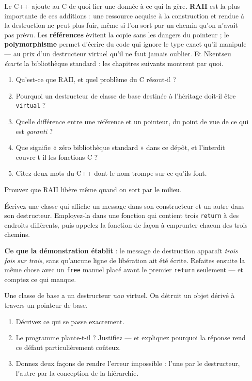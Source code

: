 \begin{nkbilan}
Le C++ ajoute au C de quoi lier une donnée à ce qui la gère. \textbf{RAII} est
la plus importante de ces additions : une ressource acquise à la construction et
rendue à la destruction ne peut plus fuir, même si l'on sort par un chemin qu'on
n'avait pas prévu. Les \textbf{références} évitent la copie sans les dangers du
pointeur ; le \textbf{polymorphisme} permet d'écrire du code qui ignore le type
exact qu'il manipule --- au prix d'un destructeur virtuel qu'il ne faut jamais
oublier. Et Nkentseu \emph{écarte} la bibliothèque standard : les chapitres
suivants montrent par quoi.
\end{nkbilan}

\begin{nkquestions}
\begin{enumerate}
\item Qu'est-ce que RAII, et quel problème du C résout-il ?
\item Pourquoi un destructeur de classe de base destinée à l'héritage
      doit-il être \texttt{virtual} ?
\item Quelle différence entre une référence et un pointeur, du point de vue de
      ce qui est \emph{garanti} ?
\item Que signifie « zéro bibliothèque standard » dans ce dépôt, et l'interdit
      couvre-t-il les fonctions C ?
\item Citez deux mots du C++ dont le nom trompe sur ce qu'ils font.
\end{enumerate}
\end{nkquestions}

\begin{nkdemo}
Prouvez que RAII libère même quand on sort par le milieu.

Écrivez une classe qui affiche un message dans son constructeur et un autre dans
son destructeur. Employez-la dans une fonction qui contient trois
\texttt{return} à des endroits différents, puis appelez la fonction de façon à
emprunter chacun des trois chemins.

\textbf{Ce que la démonstration établit} : le message de destruction apparaît
\emph{trois fois sur trois}, sans qu'aucune ligne de libération ait été écrite.
Refaites ensuite la même chose avec un \texttt{free} manuel placé avant le
premier \texttt{return} seulement --- et comptez ce qui manque.
\end{nkdemo}

\begin{nklogique}
Une classe de base a un destructeur \emph{non} virtuel. On détruit un objet
dérivé à travers un pointeur de base.

\begin{enumerate}
\item Décrivez ce qui se passe exactement.
\item Le programme plante-t-il ? Justifiez --- et expliquez pourquoi la réponse
      rend ce défaut particulièrement coûteux.
\item Donnez deux façons de rendre l'erreur impossible : l'une par le
      destructeur, l'autre par la conception de la hiérarchie.
\end{enumerate}
\end{nklogique}
